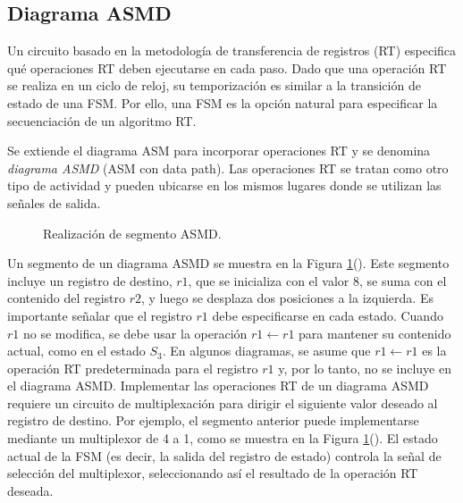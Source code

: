      \subsection{Diagrama ASMD}

      Un circuito basado en la metodología de transferencia de registros (RT) especifica qué operaciones RT deben ejecutarse en cada paso. Dado que una operación RT se realiza en un ciclo de reloj, su temporización es similar a la transición de estado de una FSM. Por ello, una FSM es la opción natural para especificar la secuenciación de un algoritmo RT. 

      Se extiende el diagrama ASM para incorporar operaciones RT y se denomina \textit{diagrama ASMD} (ASM con data path). Las operaciones RT se tratan como otro tipo de actividad y pueden ubicarse en los mismos lugares donde se utilizan las señales de salida.

    \begin{figure}[!h]
        \centering
        \caption{Realización de segmento ASMD.}
        \label{fig:asmd_figure}
    \end{figure}

    Un segmento de un diagrama ASMD se muestra en la Figura \ref{fig:asmd_figure}(). Este segmento incluye un registro de destino, $r1$, que se inicializa con el valor 8, se suma con el contenido del registro $r2$, y luego se desplaza dos posiciones a la izquierda. Es importante señalar que el registro $r1$ debe especificarse en cada estado. Cuando $r1$ no se modifica, se debe usar la operación $r1 \leftarrow r1$ para mantener su contenido actual, como en el estado $S_{3}$. En algunos diagramas, se asume que $r1 \leftarrow r1$ es la operación RT predeterminada para el registro $r1$ y, por lo tanto, no se incluye en el diagrama ASMD. Implementar las operaciones RT de un diagrama ASMD requiere un circuito de multiplexación para dirigir el siguiente valor deseado al registro de destino. Por ejemplo, el segmento anterior puede implementarse mediante un multiplexor de 4 a 1, como se muestra en la Figura \ref{fig:asmd_figure}(). El estado actual de la FSM (es decir, la salida del registro de estado) controla la señal de selección del multiplexor, seleccionando así el resultado de la operación RT deseada.

